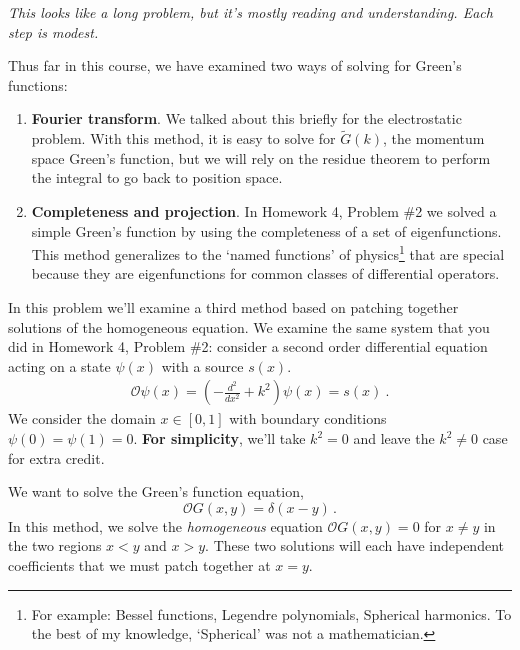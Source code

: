 \documentclass[12pt]{article}
\numberwithin{equation}{section}    %
\renewcommand{\tilde}{\widetilde}   %
\begin{document}
\emph{This looks like a long problem, but it's mostly reading and understanding. Each step is modest.}



Thus far in this course, we have examined two ways of solving for Green's functions:
\begin{enumerate}
	\item \textbf{Fourier transform}. We talked about this briefly for the electrostatic problem. With this method, it is easy to solve for $\tilde G(k)$, the momentum space Green's function, but we will rely on the residue theorem to perform the integral to go back to position space.
	\item \textbf{Completeness and projection}. In Homework 4, Problem \#2 we solved a simple Green's function by using the completeness of a set of eigenfunctions. This method generalizes to the `named functions' of physics\footnote{For example: Bessel functions, Legendre polynomials, Spherical harmonics. To the best of my knowledge, `Spherical' was not a mathematician.} that are special because they are eigenfunctions for common classes of differential operators.
\end{enumerate}
In this problem we'll examine a third method based on patching together solutions of the homogeneous equation.  We examine the same system that you did in Homework 4, Problem \#2: consider a second order differential equation acting on a state $\psi(x)$ with a source $s(x)$. 
\begin{align*}
\mathcal O \psi(x) = 
	\left(-\frac{d^2}{dx^2} + k^2 \right) \psi(x) = s(x) \ .
\end{align*}
We consider the domain $x\in[0,1]$ with boundary conditions $\psi(0) = \psi(1) = 0$. \textbf{For simplicity}, we'll take $k^2 = 0$ and leave the $k^2 \neq 0$ case for extra credit.



We want to solve the Green's function equation, $$\mathcal O G(x,y) = \delta(x-y)\, .$$ In this method, we solve the \emph{homogeneous} equation $\mathcal O G(x,y) = 0$ for $x\neq y$ in the two regions $x<y$ and $x>y$. These two solutions will each have independent coefficients that we must patch together at $x=y$.
\end{document}

